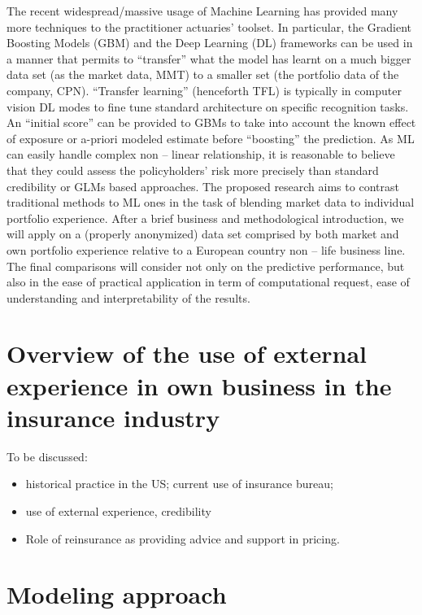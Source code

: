\documentclass[
]{article}
\providecommand{\tightlist}{%
  \setlength{\itemsep}{0pt}\setlength{\parskip}{0pt}}
\begin{document}
The recent widespread/massive usage of Machine Learning has provided
many more techniques to the practitioner actuaries' toolset. In
particular, the Gradient Boosting Models (GBM) and the Deep Learning
(DL) frameworks can be used in a manner that permits to ``transfer''
what the model has learnt on a much bigger data set (as the market data,
MMT) to a smaller set (the portfolio data of the company, CPN).
``Transfer learning'' (henceforth TFL) is typically in computer vision
DL modes to fine tune standard architecture on specific recognition
tasks. An ``initial score'' can be provided to GBMs to take into account
the known effect of exposure or a-priori modeled estimate before
``boosting'' the prediction. As ML can easily handle complex non --
linear relationship, it is reasonable to believe that they could assess
the policyholders' risk more precisely than standard credibility or GLMs
based approaches. The proposed research aims to contrast traditional
methods to ML ones in the task of blending market data to individual
portfolio experience. After a brief business and methodological
introduction, we will apply on a (properly anonymized) data set
comprised by both market and own portfolio experience relative to a
European country non -- life business line. The final comparisons will
consider not only on the predictive performance, but also in the ease of
practical application in term of computational request, ease of
understanding and interpretability of the results.

\hypertarget{overview-of-the-use-of-external-experience-in-own-business-in-the-insurance-industry}{%
\section{Overview of the use of external experience in own business in
the insurance
industry}\label{overview-of-the-use-of-external-experience-in-own-business-in-the-insurance-industry}}

To be discussed:

\begin{itemize}
\tightlist
\item
  historical practice in the US; current use of insurance bureau;
\item
  use of external experience, credibility
\item
  Role of reinsurance as providing advice and support in pricing.
\end{itemize}

\hypertarget{modeling-approach}{%
\section{Modeling approach}\label{modeling-approach}}
\end{document}
